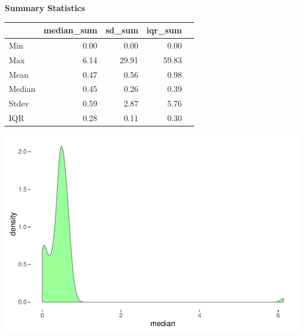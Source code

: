 \documentclass{article}\usepackage[]{graphicx}\usepackage[]{color}
\makeatletter
\def\maxwidth{ %
  \ifdim\Gin@nat@width>\linewidth
    \linewidth
  \else
    \Gin@nat@width
  \fi
}
\makeatother
\begin{document}
\vspace*{1.5cm}
  \raggedright{\color{white!30!black} \textbf{\Large Summary Statistics}}
    \begin{minipage}[c]{0.99\textwidth}  
      \vspace*{0.2cm}
      
\begin{tabular}{lrrrl}
  & median\_sum & sd\_sum & iqr\_sum &  \\ 
  \hline
Min & 0.00 & 0.00 & 0.00 &  \\ 
  Max & 6.14 & 29.91 & 59.83 &  \\ 
  Mean & 0.47 & 0.56 & 0.98 &  \\ 
  Median & 0.45 & 0.26 & 0.39 &  \\ 
  Stdev & 0.59 & 2.87 & 5.76 &  \\ 
  IQR & 0.28 & 0.11 & 0.30 &  \\ 
  \end{tabular}

      \vspace*{0.5cm}
    \end{minipage}
    
    \begin{minipage}[c]{0.99\textwidth}  


{\centering \includegraphics[width=\maxwidth]{figure/plot2-1} 

}



      \vspace*{0.5cm}
    \end{minipage}
\end{document}
